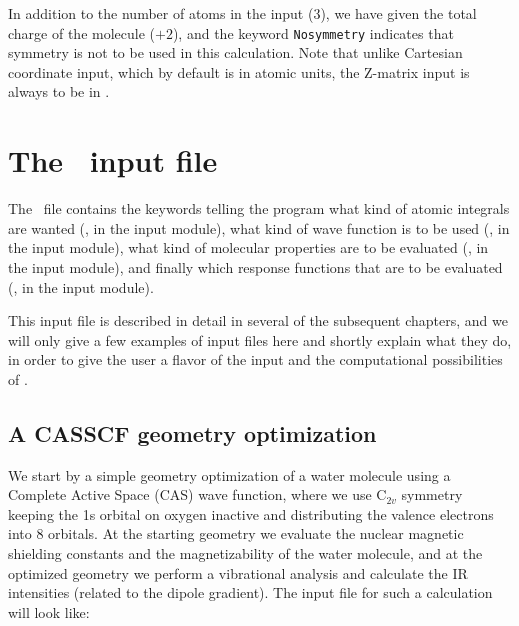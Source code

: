 In addition to the number of atoms in the input (3), we have given the
total charge of the
molecule ($+2$), and the keyword \verb|Nosymmetry| indicates that
symmetry is not to be used in this calculation. Note that
unlike Cartesian coordinate input, which by default is in atomic units, the
Z-matrix input is always to be in \angstrom{}.

\section{The \dalinp\ input file}\label{sec:daltoninp}

The \dalinp\ file contains the keywords telling the program
what kind of atomic integrals are wanted
({\her}, in the  input module), what kind of wave
function is to be used ({\sir}, in the
 input
module), what kind of molecular properties  are
to be evaluated (\aba , in the  input module), and
finally which response functions that are to
be evaluated (\resp , in
the  input module).

This input file is described in detail in several of the subsequent chapters,
and we will  only give a few examples of input files here and shortly
explain what they do, in order to give the user a flavor of the input
and the computational possibilities
of {\dalton}.

\subsection{A CASSCF geometry optimization}

We start by a simple geometry optimization 
of a water molecule using a Complete 
Active Space (CAS) wave function, where we use C$_{2v}$ symmetry
keeping the 1s orbital on oxygen inactive and distributing the valence
electrons  into 8 orbitals. At the starting geometry we
evaluate the nuclear magnetic shielding constants 
and the magnetizability of the water
molecule, and at the optimized geometry we perform a vibrational
analysis and calculate the IR
intensities 
(related to the dipole
gradient). The input file for such a calculation will look like:

